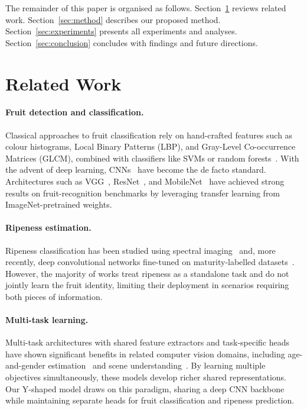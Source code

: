 \documentclass[10pt,twocolumn,letterpaper]{article}
\begin{document}
The remainder of this paper is organised as follows.
Section~\ref{sec:related} reviews related work.
Section~\ref{sec:method} describes our proposed method.
Section~\ref{sec:experiments} presents all experiments and analyses.
Section~\ref{sec:conclusion} concludes with findings and future directions.

\section{Related Work}
\label{sec:related}

\paragraph{Fruit detection and classification.}
Classical approaches to fruit classification rely on hand-crafted features such as colour histograms, Local Binary Patterns (LBP), and Gray-Level Co-occurrence Matrices (GLCM), combined with classifiers like SVMs or random forests~\cite{zhang2014fruit}.
With the advent of deep learning, CNNs~\cite{krizhevsky2012imagenet} have become the de facto standard.
Architectures such as VGG~\cite{simonyan2014very}, ResNet~\cite{he2016deep}, and MobileNet~\cite{sandler2018mobilenetv2} have achieved strong results on fruit-recognition benchmarks by leveraging transfer learning from ImageNet-pretrained weights.

\paragraph{Ripeness estimation.}
Ripeness classification has been studied using spectral imaging~\cite{elmasry2007prediction} and, more recently, deep convolutional networks fine-tuned on maturity-labelled datasets~\cite{rauf2019visual}.
However, the majority of works treat ripeness as a standalone task and do not jointly learn the fruit identity, limiting their deployment in scenarios requiring both pieces of information.

\paragraph{Multi-task learning.}
Multi-task architectures with shared feature extractors and task-specific heads have shown significant benefits in related computer vision domains, including age-and-gender estimation~\cite{rothe2018deep} and scene understanding~\cite{kendall2018multi}.
By learning multiple objectives simultaneously, these models develop richer shared representations.
Our Y-shaped model draws on this paradigm, sharing a deep CNN backbone while maintaining separate heads for fruit classification and ripeness prediction.
\end{document}
